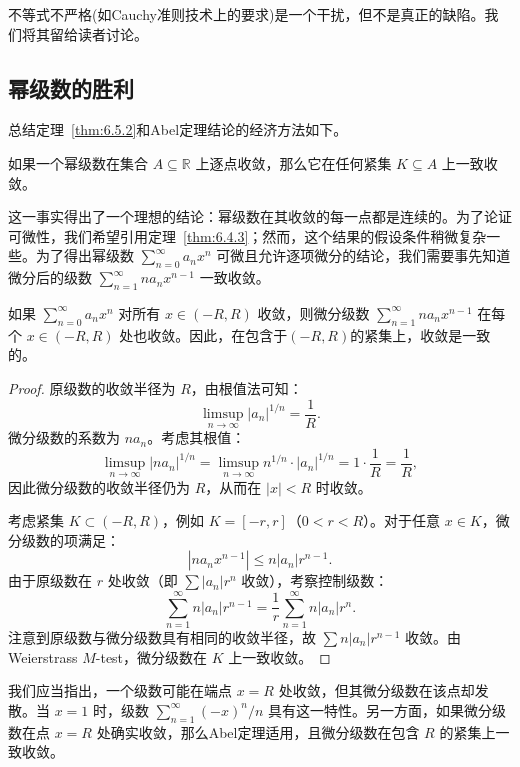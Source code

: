不等式不严格(如Cauchy准则技术上的要求)是一个干扰，但不是真正的缺陷。我们将其留给读者讨论。

\subsection{幂级数的胜利}
总结定理~\ref{thm:6.5.2}和Abel定理结论的经济方法如下。
\begin{Thm}
  \label{thm:6.5.5}
  如果一个幂级数在集合 \(A \subseteq  \mathbb{R}\) 上逐点收敛，那么它在任何紧集 \(K \subseteq  A\) 上一致收敛。
\end{Thm}

这一事实得出了一个理想的结论：幂级数在其收敛的每一点都是连续的。为了论证可微性，我们希望引用定理~\ref{thm:6.4.3}；然而，这个结果的假设条件稍微复杂一些。为了得出幂级数 \(\mathop{\sum }\limits_{{n = 0}}^{\infty }{a}_{n}{x}^{n}\) 可微且允许逐项微分的结论，我们需要事先知道微分后的级数 \(\mathop{\sum }\limits_{{n = 1}}^{\infty }n{a}_{n}{x}^{n - 1}\) 一致收敛。

\begin{Thm}
  \label{thm:6.5.6}
  如果 \(\mathop{\sum }\limits_{{n = 0}}^{\infty }{a}_{n}{x}^{n}\) 对所有 \(x \in  \left( {-R,R}\right)\) 收敛，则微分级数 \(\mathop{\sum }\limits_{{n = 1}}^{\infty }n{a}_{n}{x}^{n - 1}\) 在每个 \(x \in  \left( {-R,R}\right)\) 处也收敛。因此，在包含于$(-R, R)$的紧集上，收敛是一致的。
\end{Thm}

\begin{proof}
原级数的收敛半径为 \(R\)，由根值法可知：
\[
\limsup_{n\to\infty} |a_n|^{1/n} = \frac{1}{R}.
\]
微分级数的系数为 \(n a_n\)。考虑其根值：
\[
\limsup_{n\to\infty} |n a_n|^{1/n} = \limsup_{n\to\infty} n^{1/n} \cdot |a_n|^{1/n} = 1 \cdot \frac{1}{R} = \frac{1}{R},
\]
因此微分级数的收敛半径仍为 \(R\)，从而在 \(|x| < R\) 时收敛。

考虑紧集 \(K \subset (-R, R)\)，例如 \(K = [-r, r]\)（\(0 < r < R\)）。对于任意 \(x \in K\)，微分级数的项满足：
\[
|n a_n x^{n-1}| \leq n |a_n| r^{n-1}.
\]
由于原级数在 \(r\) 处收敛（即 \(\sum |a_n| r^n\) 收敛），考察控制级数：
\[
\sum_{n=1}^{\infty} n |a_n| r^{n-1} = \frac{1}{r} \sum_{n=1}^{\infty} n |a_n| r^n.
\]
注意到原级数与微分级数具有相同的收敛半径，故 \(\sum n |a_n| r^{n-1}\) 收敛。由 Weierstrass $M$-test，微分级数在 \(K\) 上一致收敛。
\end{proof}


我们应当指出，一个级数可能在端点 \(x = R\) 处收敛，但其微分级数在该点却发散。当 \(x = 1\) 时，级数 \(\mathop{\sum }\limits_{{n = 1}}^{\infty }{\left( -x\right) }^{n}/n\) 具有这一特性。另一方面，如果微分级数在点 \(x = R\) 处确实收敛，那么Abel定理适用，且微分级数在包含 \(R\) 的紧集上一致收敛。

